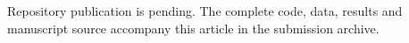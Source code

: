 Repository publication is pending. The complete code, data, results and manuscript source accompany this article in the submission archive.
